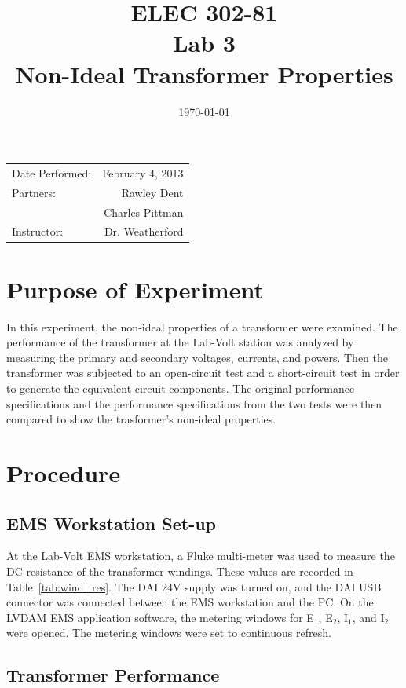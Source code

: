 \documentclass{article}
\title{ELEC 302-81\\ Lab 3\\ Non-Ideal Transformer Properties} %
\date{\today} %
\begin{document}
\maketitle

\begin{center}
  \begin{tabular}{lr}
    Date Performed: & February 4, 2013 \\
    Partners: & Rawley Dent \\
              & Charles Pittman \\
    Instructor: & Dr. Weatherford
  \end{tabular}
\end{center}

\pagebreak


\section{Purpose of Experiment}
In this experiment, the non-ideal properties of a transformer were examined. The performance
of the transformer at the Lab-Volt station was analyzed by measuring the primary and secondary
voltages, currents, and powers. Then the transformer was subjected to an open-circuit test and 
a short-circuit test in order to generate the equivalent circuit components. The original performance 
specifications and the performance specifications from the two tests were then compared to show 
the trasformer's non-ideal properties.

\section{Procedure}
\subsection{EMS Workstation Set-up}

At the Lab-Volt EMS workstation, a Fluke multi-meter was used to measure the DC
resistance of the transformer windings. These values are recorded in
Table~\ref{tab:wind_res}.  The DAI 24V supply was turned on, and the DAI USB
connector was connected between the EMS workstation and the {PC}. On the LVDAM
EMS application software, the metering windows for E$_1$, E$_2$, I$_1$,
and I$_2$ were opened. The metering windows were set to continuous refresh.

\subsection{Transformer Performance}
\end{document}
